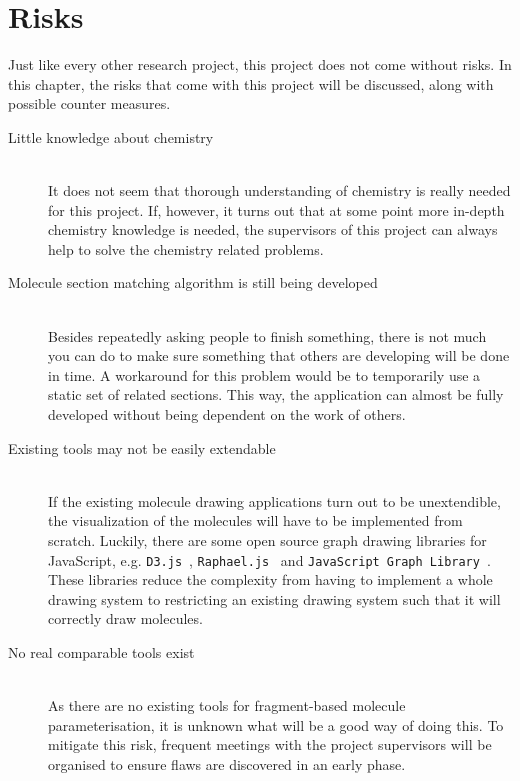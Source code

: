 \chapter{Risks}

Just like every other research project, this project does not come without risks. In this chapter, the risks that come with this project will be discussed, along with possible counter measures.

\begin{description}
\item[Little knowledge about chemistry]~~\\
It does not seem that thorough understanding of chemistry is really needed for this project. If, however, it turns out that at some point more in-depth chemistry knowledge is needed, the supervisors of this project can always help to solve the chemistry related problems.

\item[Molecule section matching algorithm is still being developed]~~\\
Besides repeatedly asking people to finish something, there is not much you can do to make sure something that others are developing will be done in time. A workaround for this problem would be to temporarily use a static set of related sections. This way, the application can almost be fully developed without being dependent on the work of others.

\item[Existing tools may not be easily extendable]~~\\
If the existing molecule drawing applications turn out to be unextendible, the visualization of the molecules will have to be implemented from scratch. Luckily, there are some open source graph drawing libraries for JavaScript, e.g. \verb|D3.js|~\cite{bostock2012data}, \verb|Raphael.js|~\cite{baranovski2013raphael} and \verb|JavaScript Graph Library|~\cite{dracula2012javascript}. These libraries reduce the complexity from having to implement a whole drawing system to restricting an existing drawing system such that it will correctly draw molecules. 

\item[No real comparable tools exist]~~\\
As there are no existing tools for fragment-based molecule parameterisation, it is unknown what will be a good way of doing this. To mitigate this risk, frequent meetings with the project supervisors will be organised to ensure flaws are discovered in an early phase.
\end{description}
